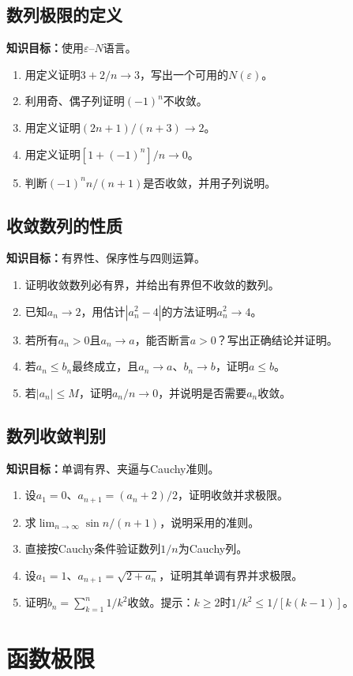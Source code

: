 \documentclass[11pt,a4paper,fontset=fandol]{ctexrep}
\newcommand{\goal}[1]{\textbf{知识目标：}#1\par}
\begin{document}
\subsection{数列极限的定义}
\goal{使用$\varepsilon$--$N$语言。}
\begin{enumerate}
\item 用定义证明$3+2/n\to3$，写出一个可用的$N(\varepsilon)$。
\item 利用奇、偶子列证明$(-1)^n$不收敛。
\item 用定义证明$(2n+1)/(n+3)\to2$。
\item 用定义证明$[1+(-1)^n]/n\to0$。
\item 判断$(-1)^n n/(n+1)$是否收敛，并用子列说明。
\end{enumerate}
\subsection{收敛数列的性质}
\goal{有界性、保序性与四则运算。}
\begin{enumerate}
\item 证明收敛数列必有界，并给出有界但不收敛的数列。
\item 已知$a_n\to2$，用估计$|a_n^2-4|$的方法证明$a_n^2\to4$。
\item 若所有$a_n>0$且$a_n\to a$，能否断言$a>0$？写出正确结论并证明。
\item 若$a_n\le b_n$最终成立，且$a_n\to a$、$b_n\to b$，证明$a\le b$。
\item 若$|a_n|\le M$，证明$a_n/n\to0$，并说明是否需要$a_n$收敛。
\end{enumerate}
\subsection{数列收敛判别}
\goal{单调有界、夹逼与Cauchy准则。}
\begin{enumerate}
\item 设$a_1=0$、$a_{n+1}=(a_n+2)/2$，证明收敛并求极限。
\item 求$\lim_{n\to\infty}\sin n/(n+1)$，说明采用的准则。
\item 直接按Cauchy条件验证数列$1/n$为Cauchy列。
\item 设$a_1=1$、$a_{n+1}=\sqrt{2+a_n}$，证明其单调有界并求极限。
\item 证明$b_n=\sum_{k=1}^n1/k^2$收敛。提示：$k\ge2$时$1/k^2\le1/[k(k-1)]$。
\end{enumerate}
\section{函数极限}
\end{document}
